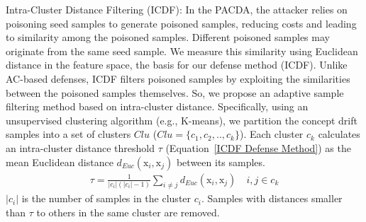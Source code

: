 \documentclass[conference,compsoc]{IEEEtran} %
\begin{document}
Intra-Cluster Distance Filtering (ICDF): In the PACDA, the attacker relies on poisoning seed samples to generate poisoned samples, reducing costs and leading to similarity among the poisoned samples.
Different poisoned samples may originate from the same seed sample.
We measure this similarity using Euclidean distance in the feature space, the basis for our defense method (ICDF).
Unlike AC-based defenses, ICDF filters poisoned samples by exploiting the similarities between the poisoned samples themselves.
So, we propose an adaptive sample filtering method based on intra-cluster distance.
Specifically, using an unsupervised clustering algorithm (e.g., K-means), we partition the concept drift samples into a set of clusters $Clu$ ($Clu= \{c_{1},c_{2},..,c_{k} \}$).
Each cluster $c_{k}$ calculates an intra-cluster distance threshold $\tau$ (Equation~\ref{ICDF Defense Method}) as the mean Euclidean distance $d_{Euc}(\bm{\mathrm{x}}_{i}, \bm{\mathrm{x}}_{j})$ between its samples.
\begin{equation}
	\begin{aligned}
		\tau = \frac{1}{|c_{i}| (|c_{i}| - 1)} \sum_{i \neq j} d_{Euc}(\bm{\mathrm{x}}_{i}, \bm{\mathrm{x}}_{j}) \quad i,j \in c_{k}
	\end{aligned}
	\label{ICDF Defense Method}
\end{equation}
$|c_{i}|$ is the number of samples in the cluster $c_{i}$.
Samples with distances smaller than $\tau$ to others in the same cluster are removed.
\end{document}
